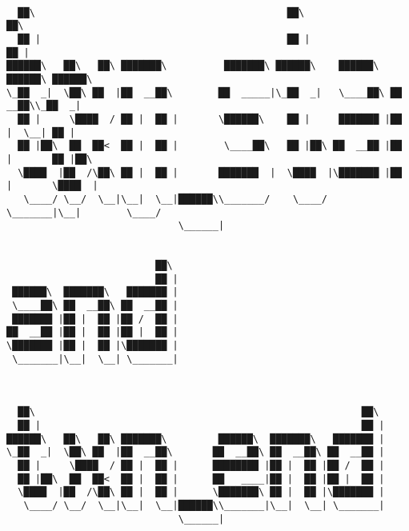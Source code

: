 \documentclass[varwidth=\maxdimen,margin=0.5cm,multi={verbatim}]{standalone}
\begin{document}
\begin{verbatim}

  ██\                                            ██\                          ██\
  ██ |                                           ██ |                         ██ |
██████\   ██\   ██\ ███████\          ███████\ ██████\    ██████\   ██████\ ██████\
\_██  _|  \██\ ██  |██  __██\        ██  _____|\_██  _|   \____██\ ██  __██\\_██  _|
  ██ |     \████  / ██ |  ██ |       \██████\    ██ |     ███████ |██ |  \__| ██ |
  ██ |██\  ██  ██<  ██ |  ██ |        \____██\   ██ |██\ ██  __██ |██ |       ██ |██\
  \████  |██  /\██\ ██ |  ██ |       ███████  |  \████  |\███████ |██ |       \████  |
   \____/ \__/  \__|\__|  \__|██████\\_______/    \____/  \_______|\__|        \____/
                              \______|


                          ██\
                          ██ |
 ██████\  ███████\   ███████ |
 \____██\ ██  __██\ ██  __██ |
 ███████ |██ |  ██ |██ /  ██ |
██  __██ |██ |  ██ |██ |  ██ |
\███████ |██ |  ██ |\███████ |
 \_______|\__|  \__| \_______|



  ██\                                                         ██\
  ██ |                                                        ██ |
██████\   ██\   ██\ ███████\         ██████\  ███████\   ███████ |
\_██  _|  \██\ ██  |██  __██\       ██  __██\ ██  __██\ ██  __██ |
  ██ |     \████  / ██ |  ██ |      ████████ |██ |  ██ |██ /  ██ |
  ██ |██\  ██  ██<  ██ |  ██ |      ██   ____|██ |  ██ |██ |  ██ |
  \████  |██  /\██\ ██ |  ██ |      \███████\ ██ |  ██ |\███████ |
   \____/ \__/  \__|\__|  \__|██████\\_______|\__|  \__| \_______|
                              \______|





\end{verbatim}
\end{document}
